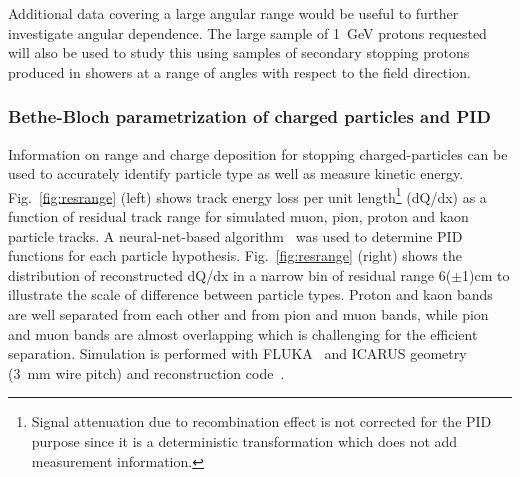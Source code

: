 Additional data covering a large angular range would be useful to further investigate angular dependence.
The large sample of 1~GeV protons requested will also be used to study this using 
samples of secondary stopping protons produced in showers at a range of angles with
respect to the field direction.

\subsubsection{Bethe-Bloch parametrization of charged particles and PID}

%
\label{detbeam_pid}


Information on range and charge deposition for stopping charged-particles can be used to 
accurately identify particle type as well as measure kinetic energy. 
Fig.~\ref{fig:resrange}  (left) shows track energy loss per unit length\footnote{Signal attenuation due to recombination effect is not corrected for the PID purpose since it is a deterministic transformation which does not add measurement information.}
(dQ/dx) as a function of residual 
track range for simulated muon, pion, proton and kaon particle tracks. 
A neural-net-based algorithm~\cite{nn_pid,rd_pid}
was used to determine PID functions for each particle hypothesis.
Fig.~\ref{fig:resrange} (right) 
shows the distribution of reconstructed dQ/dx in a narrow bin of residual range 6($\pm$1)cm to illustrate the scale of difference between particle types. Proton and kaon bands are well separated from each other and from pion and muon bands, while pion and muon bands are almost overlapping which is challenging for the efficient separation. 
Simulation is performed with
FLUKA~\cite{fluka05} and ICARUS geometry (3~mm wire pitch) and reconstruction code~\cite{icarus_reco}.

